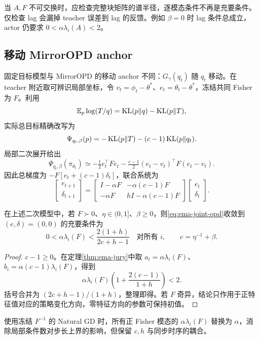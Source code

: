 当 $A,F$ 不可交换时，应检查完整块矩阵的谱半径，逐模态条件不再是充要条件。仅检查 lag 会漏掉 teacher 误差到 lag 的反馈。例如 $\beta=0$ 时 lag 条件总成立，actor 仍要求 $0<\alpha\lambda_i(A)<2$。

\subsection{移动 MirrorOPD anchor}

固定目标模型与 MirrorOPD 的移动 anchor 不同：$G_\gamma(q_t)$ 随 $q_t$ 移动。在 teacher 附近取可辨识局部坐标，令 $v_t=\phi_t-\theta^*$、$e_t=\theta_t-\theta^*$，冻结共同 Fisher 为 $F$。利用
\[
 \mathbb{E}_p\log(T/q)=\operatorname{KL}(p\Vert q)-\operatorname{KL}(p\Vert T),
\]
实际总目标精确改写为
\[
 \Psi_{q_t,\beta}(p)=-\operatorname{KL}(p\Vert T)-(c-1)\operatorname{KL}(p\Vert q_t).
\]
局部二次展开给出
\[
 \Psi_{q_t,\beta}(\pi_{\theta_t})
 \simeq-\tfrac12e_t^\top Fe_t-
 \tfrac{c-1}{2}(e_t-v_t)^\top F(e_t-v_t).
\]
因此总梯度为 $-F[e_t+(c-1)\delta_t]$，联合系统为
\begin{equation}
 \begin{bmatrix}e_{t+1}\\\delta_{t+1}\end{bmatrix}
 =\begin{bmatrix}I-\alpha F&-\alpha(c-1)F\\
                  -\alpha F&hI-\alpha(c-1)F\end{bmatrix}
   \begin{bmatrix}e_t\\\delta_t\end{bmatrix}.
 \label{eq:ema-joint-opd}
\end{equation}

\begin{corollary}
\label{cor:ema-opd-jury}
在上述二次模型中，若 $F\succ0$、$\eta\in(0,1]$、$\beta\ge0$，则\eqref{eq:ema-joint-opd}收敛到 $(e,\delta)=(0,0)$ 的充要条件为
\[
 0<\alpha\lambda_i(F)<\frac{2(1+h)}{2c+h-1}\quad\text{对所有 }i,
 \qquad c=\eta^{-1}+\beta.
\]
\end{corollary}
\begin{proof}
$c-1\ge0$。在定理\ref{thm:ema-jury}中取 $a_i=\alpha\lambda_i(F)$、$b_i=\alpha(c-1)\lambda_i(F)$，得到
\[
 \alpha\lambda_i(F)\left(1+\frac{2(c-1)}{1+h}\right)<2.
\]
括号合并为 $(2c+h-1)/(1+h)$，整理即得。若 $F$ 奇异，结论只作用于正特征值对应的策略变化方向，零特征方向的参数可保持初值。
\end{proof}

使用冻结 $F^{-1}$ 的 Natural GD 时，所有正 Fisher 模态的 $\alpha\lambda_i(F)$ 替换为 $\alpha$，消除局部条件数对步长上界的影响，但保留 $c,h$ 与同步时序的耦合。

